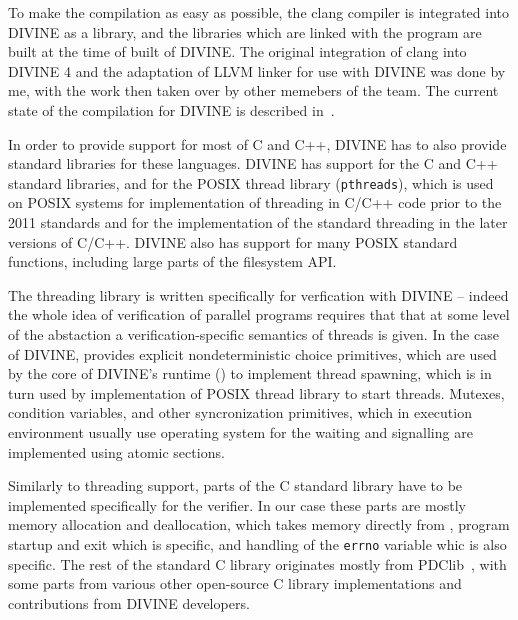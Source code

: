 To make the compilation as easy as possible, the clang compiler is integrated
into DIVINE as a library, and the libraries which are linked with the program
are built at the time of built of DIVINE.
The original integration of clang into DIVINE 4 and the adaptation of LLVM
linker for use with DIVINE was done by me, with the work then taken over by
other memebers of the team.
The current state of the compilation for DIVINE is described in~.


In order to provide support for most of C and C++, DIVINE has to also provide
standard libraries for these languages.
DIVINE has support for the C and C++ standard libraries, and for the POSIX
thread library (\texttt{pthreads}), which is used on POSIX systems for
implementation of threading in C/C++ code prior to the 2011 standards and for
the implementation of the standard threading in the later versions of C/C++.
DIVINE also has support for many POSIX standard functions, including large parts of the filesystem API.

The threading library is written specifically for verfication with DIVINE --
indeed the whole idea of verification of parallel programs requires that that
at some level of the abstaction a verification-specific semantics of threads is
given.
In the case of DIVINE, \divm provides explicit nondeterministic choice
primitives, which are used by the core of DIVINE's runtime (\dios) to implement
thread spawning, which is in turn used by implementation of POSIX thread
library to start threads.
Mutexes, condition variables, and other syncronization primitives, which in
execution environment usually use operating system for the waiting and
signalling are implemented using atomic sections. 

Similarly to threading support, parts of the C standard library have to be
implemented specifically for the verifier.
In our case these parts are mostly memory allocation and deallocation, which
takes memory directly from \divm, program startup and exit which is \dios specific, and handling of the \texttt{errno} variable whic is also \dios specific.
The rest of the standard C library originates mostly from
PDClib~, with some parts from various other open-source C
library implementations and contributions from DIVINE developers.

